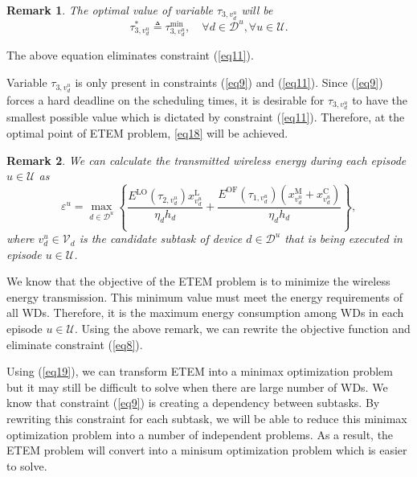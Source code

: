 \documentclass[12pt,draftclsnofoot,onecolumn]{IEEEtran}
\newtheorem*{remark}{Remark}
\begin{document}
\begin{remark}
	The optimal value of variable $\tau_{3,v_d^u}$ will be
	\begin{equation}\label{eq18}
		\tau_{3,v_d^u}^{\ast} \triangleq \tau_{3,v_d^u}^{\min},\quad\forall d\in\mathcal{D}^u, \forall u\in\mathcal{U}.
	\end{equation}
\end{remark}
\noindent The above equation eliminates constraint (\ref{eq11}).

Variable $\tau_{3,v_d^u}$ is only present in constraints (\ref{eq9}) and (\ref{eq11}). Since (\ref{eq9}) forces a hard deadline on the scheduling times, it is desirable for $\tau_{3,v_d^u}$ to have the smallest possible value which is dictated by constraint (\ref{eq11}). Therefore, at the optimal point of ETEM problem, \ref{eq18} will be achieved.

\begin{remark}
	We can calculate the transmitted wireless energy during each episode $u\in\mathcal{U}$ as
	\begin{equation}\label{eq19}
		\varepsilon^u = \max_{d\in\mathcal{D}^u}\left\{\frac{E^{\text{LO}}(\tau_{2,v_d^u})x^{\text{L}}_{v_d^u}}{\eta_d h_d} + \frac{E^{\text{OF}}(\tau_{1,v_d^u})\left(x^{\text{M}}_{v_d^u}+x^{\text{C}}_{v_d^u}\right)}{\eta_d h_d}\right\},
	\end{equation}
	where $v_d^u\in\mathcal{V}_d$ is the candidate subtask of device $d\in\mathcal{D}^u$ that is being executed in episode $u\in\mathcal{U}$.
\end{remark}

We know that the objective of the ETEM problem is to minimize the wireless energy transmission. This minimum value must meet the energy requirements of all WDs. Therefore, it is the maximum energy consumption among WDs in each episode $u\in\mathcal{U}$. Using the above remark, we can rewrite the objective function and eliminate constraint (\ref{eq8}).

Using (\ref{eq19}), we can transform ETEM into a minimax optimization problem but it may still be difficult to solve when there are large number of WDs. We know that constraint (\ref{eq9}) is creating a dependency between subtasks. By rewriting this constraint for each subtask, we will be able to reduce this minimax optimization problem into a number of independent problems. As a result, the ETEM problem will convert into a minisum optimization problem \cite{b18} which is easier to solve.
\end{document}
